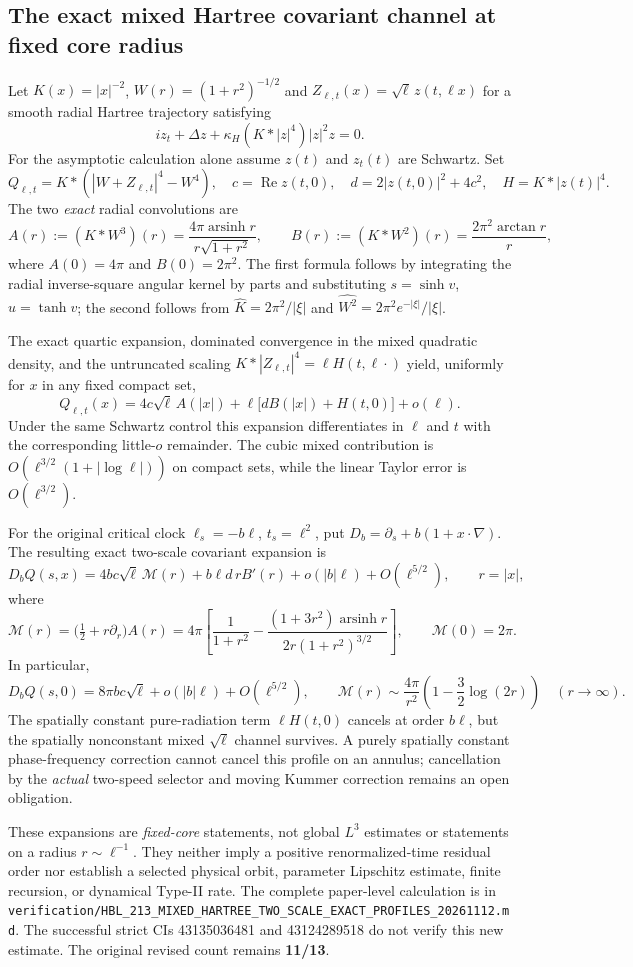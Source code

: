 \subsection*{The exact mixed Hartree covariant channel at fixed core radius}

Let $K(x)=|x|^{-2}$, $W(r)=(1+r^2)^{-1/2}$ and
$Z_{\ell,t}(x)=\sqrt{\ell}\,z(t,\ell x)$ for a smooth radial
Hartree trajectory satisfying
\[
 iz_t+\Delta z+\kappa_H(K*|z|^4)|z|^2z=0.
\]
For the asymptotic calculation alone assume $z(t)$ and $z_t(t)$
are Schwartz. Set
\[
 Q_{\ell,t}=K*(|W+Z_{\ell,t}|^4-W^4),\quad
 c=\operatorname{Re}z(t,0),\quad
 d=2|z(t,0)|^2+4c^2,\quad H=K*|z(t)|^4.
\]
The two \emph{exact} radial convolutions are
\[
 A(r):=(K*W^3)(r)
 =\frac{4\pi\operatorname{arsinh}r}{r\sqrt{1+r^2}},
 \qquad
 B(r):=(K*W^2)(r)=\frac{2\pi^2\arctan r}{r},
\]
where $A(0)=4\pi$ and $B(0)=2\pi^2$. The first formula follows by
integrating the radial inverse-square angular kernel by parts and
substituting $s=\sinh v$, $u=\tanh v$; the second follows from
$\widehat K=2\pi^2/|\xi|$ and
$\widehat{W^2}=2\pi^2 e^{-|\xi|}/|\xi|$.

The exact quartic expansion, dominated convergence in the mixed
quadratic density, and the untruncated scaling
$K*|Z_{\ell,t}|^4=\ell H(t,\ell\cdot)$ yield, uniformly for $x$ in
any fixed compact set,
\[
 \boxed{\quad
 Q_{\ell,t}(x)
 =4c\sqrt\ell\,A(|x|)
 +\ell\bigl[d B(|x|)+H(t,0)\bigr]+o(\ell).
 \quad}
\]
Under the same Schwartz control this expansion differentiates in
$\ell$ and $t$ with the corresponding little-$o$ remainder.
The cubic mixed contribution is
$O(\ell^{3/2}(1+|\log\ell|))$ on compact sets, while the linear
Taylor error is $O(\ell^{3/2})$.

For the original critical clock
$\ell_s=-b\ell$, $t_s=\ell^2$, put
$D_b=\partial_s+b(1+x\cdot\nabla)$. The resulting exact
two-scale covariant expansion is
\[
 D_bQ(s,x)
 =4bc\sqrt\ell\,\mathcal M(r)+b\ell d\,rB'(r)
 +o(|b|\ell)+O(\ell^{5/2}),\qquad r=|x|,
\]
where
\[
 \mathcal M(r)
 =\bigl(\tfrac12+r\partial_r\bigr)A(r)
 =4\pi\left[
 \frac{1}{1+r^2}
 -\frac{(1+3r^2)\operatorname{arsinh}r}
 {2r(1+r^2)^{3/2}}\right],
 \qquad \mathcal M(0)=2\pi.
\]
In particular,
\[
 D_bQ(s,0)=8\pi bc\sqrt\ell+o(|b|\ell)+O(\ell^{5/2}),\qquad
 \mathcal M(r)\sim\frac{4\pi}{r^2}
 \left(1-\frac32\log(2r)\right)\quad(r\to\infty).
\]
The spatially constant pure-radiation term $\ell H(t,0)$
cancels at order $b\ell$, but the spatially nonconstant mixed
$\sqrt\ell$ channel survives. A purely spatially constant
phase-frequency correction cannot cancel this profile on an
annulus; cancellation by the \emph{actual} two-speed selector
and moving Kummer correction remains an open obligation.

These expansions are \emph{fixed-core} statements, not global
$L^3$ estimates or statements on a radius $r\sim\ell^{-1}$.
They neither imply a positive renormalized-time residual order
nor establish a selected physical orbit, parameter Lipschitz
estimate, finite recursion, or dynamical Type-II rate. The
complete paper-level calculation is in
\texttt{verification/HBL\_213\_MIXED\_HARTREE\_TWO\_SCALE\_EXACT\_PROFILES\_20261112.md}.
The successful strict CIs 43135036481 and 43124289518 do not
verify this new estimate. The original revised count remains
\textbf{11/13}.
